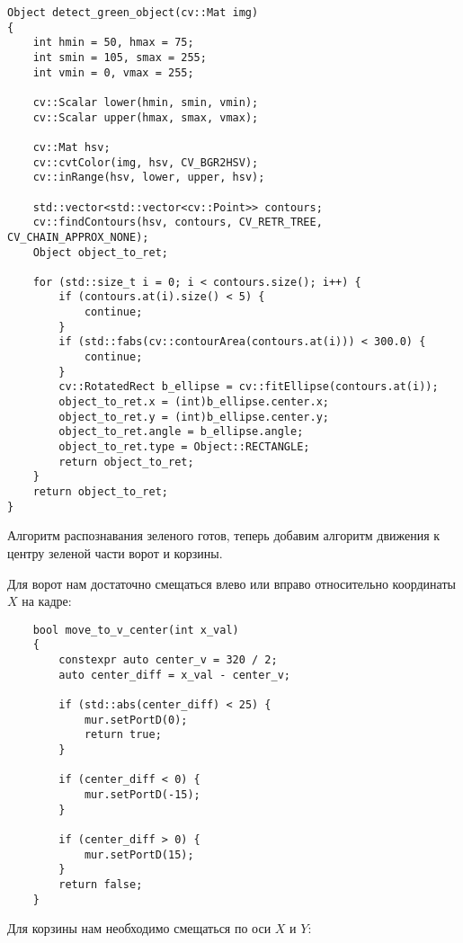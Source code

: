 \begin{verbatim}
Object detect_green_object(cv::Mat img)
{
    int hmin = 50, hmax = 75;
    int smin = 105, smax = 255;
    int vmin = 0, vmax = 255;

    cv::Scalar lower(hmin, smin, vmin);
    cv::Scalar upper(hmax, smax, vmax);

    cv::Mat hsv;
    cv::cvtColor(img, hsv, CV_BGR2HSV);
    cv::inRange(hsv, lower, upper, hsv);

    std::vector<std::vector<cv::Point>> contours;
    cv::findContours(hsv, contours, CV_RETR_TREE, CV_CHAIN_APPROX_NONE);
    Object object_to_ret;

    for (std::size_t i = 0; i < contours.size(); i++) {
        if (contours.at(i).size() < 5) {
            continue;
        }
        if (std::fabs(cv::contourArea(contours.at(i))) < 300.0) {
            continue;
        }
        cv::RotatedRect b_ellipse = cv::fitEllipse(contours.at(i));
        object_to_ret.x = (int)b_ellipse.center.x;
        object_to_ret.y = (int)b_ellipse.center.y;
        object_to_ret.angle = b_ellipse.angle;
        object_to_ret.type = Object::RECTANGLE;
        return object_to_ret;
    }
    return object_to_ret;
}
\end{verbatim}

Алгоритм распознавания зеленого готов, теперь добавим алгоритм движения к центру зеленой части ворот и корзины. 

Для ворот нам достаточно смещаться влево или вправо относительно координаты $X$ на кадре:

\begin{verbatim}
    bool move_to_v_center(int x_val)
    {
        constexpr auto center_v = 320 / 2;
        auto center_diff = x_val - center_v;

        if (std::abs(center_diff) < 25) {
            mur.setPortD(0);
            return true;
        }

        if (center_diff < 0) {
            mur.setPortD(-15);
        }

        if (center_diff > 0) {
            mur.setPortD(15);
        }
        return false;
    }
\end{verbatim}

Для корзины нам необходимо смещаться по оси $X$ и $Y$:

